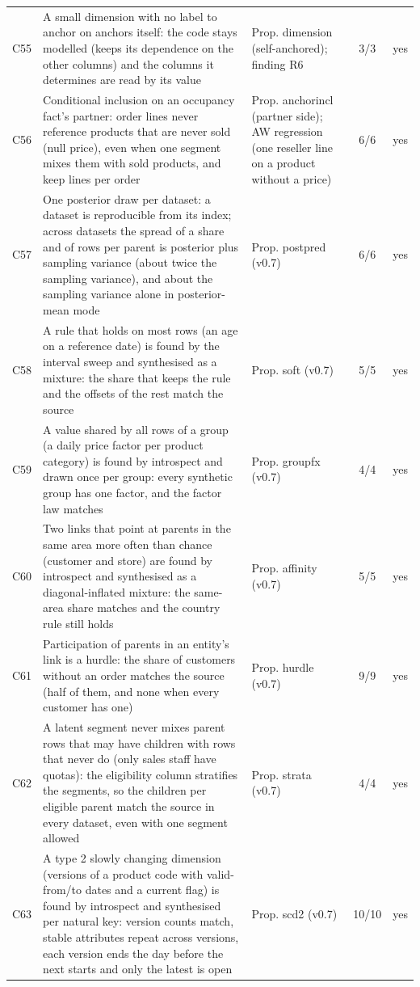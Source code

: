 \begin{longtable}{@{}l p{8.2cm} p{3.6cm} c r@{}}
C55 & A small dimension with no label to anchor on anchors itself: the code stays modelled (keeps its dependence on the other columns) and the columns it determines are read by its value & Prop. dimension (self-anchored); finding R6 & 3/3 & yes \\
C56 & Conditional inclusion on an occupancy fact's partner: order lines never reference products that are never sold (null price), even when one segment mixes them with sold products, and keep lines per order & Prop. anchorincl (partner side); AW regression (one reseller line on a product without a price) & 6/6 & yes \\
C57 & One posterior draw per dataset: a dataset is reproducible from its index; across datasets the spread of a share and of rows per parent is posterior plus sampling variance (about twice the sampling variance), and about the sampling variance alone in posterior-mean mode & Prop. postpred (v0.7) & 6/6 & yes \\
C58 & A rule that holds on most rows (an age on a reference date) is found by the interval sweep and synthesised as a mixture: the share that keeps the rule and the offsets of the rest match the source & Prop. soft (v0.7) & 5/5 & yes \\
C59 & A value shared by all rows of a group (a daily price factor per product category) is found by introspect and drawn once per group: every synthetic group has one factor, and the factor law matches & Prop. groupfx (v0.7) & 4/4 & yes \\
C60 & Two links that point at parents in the same area more often than chance (customer and store) are found by introspect and synthesised as a diagonal-inflated mixture: the same-area share matches and the country rule still holds & Prop. affinity (v0.7) & 5/5 & yes \\
C61 & Participation of parents in an entity's link is a hurdle: the share of customers without an order matches the source (half of them, and none when every customer has one) & Prop. hurdle (v0.7) & 9/9 & yes \\
C62 & A latent segment never mixes parent rows that may have children with rows that never do (only sales staff have quotas): the eligibility column stratifies the segments, so the children per eligible parent match the source in every dataset, even with one segment allowed & Prop. strata (v0.7) & 4/4 & yes \\
C63 & A type 2 slowly changing dimension (versions of a product code with valid-from/to dates and a current flag) is found by introspect and synthesised per natural key: version counts match, stable attributes repeat across versions, each version ends the day before the next starts and only the latest is open & Prop. scd2 (v0.7) & 10/10 & yes \\

\end{longtable}
